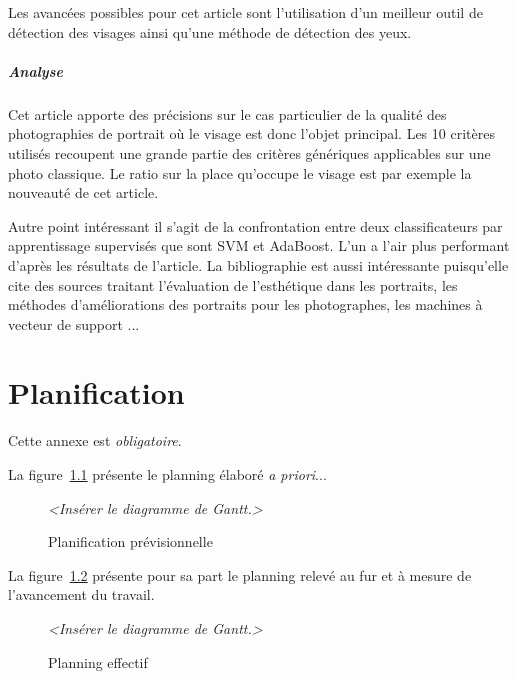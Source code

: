 \documentclass[11pt, french]{report-rd-info}
\begin{document}
Les avancées possibles pour cet article sont l’utilisation d’un meilleur outil de détection des visages ainsi qu’une méthode de détection des yeux.

\paragraph{Analyse}
Cet article apporte des précisions sur le cas particulier de la qualité des photographies de portrait où le visage est donc l’objet principal. Les 10 critères utilisés recoupent une grande partie des critères génériques applicables sur une photo classique. Le ratio sur la place qu’occupe le visage est par exemple la nouveauté de cet article. 

Autre point intéressant il s’agit de la confrontation entre deux classificateurs par apprentissage supervisés que sont SVM et AdaBoost. L’un a l’air plus performant d’après les résultats de l’article. La bibliographie est aussi intéressante puisqu’elle cite des sources traitant l’évaluation de l’esthétique dans les portraits, les méthodes d’améliorations des portraits pour les photographes, les machines à vecteur de support ...


\chapter{Planification}

Cette annexe est \emph{obligatoire}.

La figure~\ref{fig:PlanningPrevisionnel} présente le planning élaboré \emph{a priori}...

\begin{figure}
	\centering
		\emph{<Insérer le diagramme de Gantt.>}
	\caption{Planification prévisionnelle}
	\label{fig:PlanningPrevisionnel}
\end{figure}

La figure~\ref{fig:PlanningEffectif} présente pour sa part le planning relevé au fur et à mesure de l'avancement du travail.

\begin{figure}
	\centering
		\emph{<Insérer le diagramme de Gantt.>}
	\caption{Planning effectif}
	\label{fig:PlanningEffectif}
\end{figure}
\end{document}
